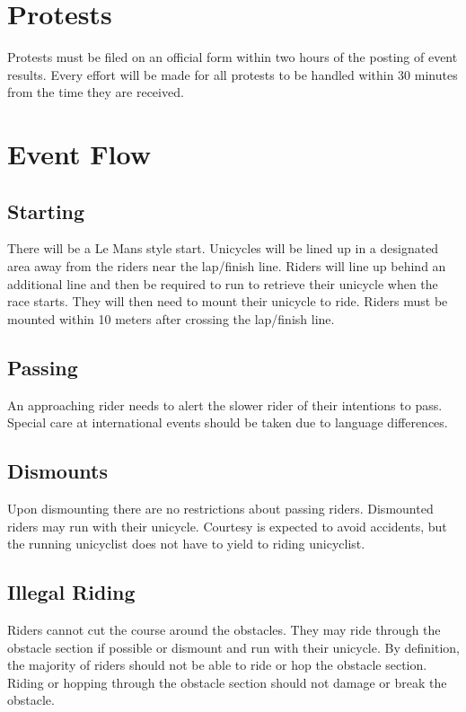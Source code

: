 \section{Protests}

Protests must be filed on an official form within two hours of the posting of event results.
Every effort will be made for all protests to be handled within 30 minutes from the time they are received.

\section{Event Flow}

\subsection{Starting}

There will be a Le Mans style start.
Unicycles will be lined up in a designated area away from the riders near the lap/finish line.
Riders will line up behind an additional line and then be required to run to retrieve their unicycle when the race starts.
They will then need to mount their unicycle to ride.
Riders must be mounted within 10 meters after crossing the lap/finish line.

\subsection{Passing}

An approaching rider needs to alert the slower rider of their intentions to pass.
Special care at international events should be taken due to language differences.

\subsection{Dismounts}

Upon dismounting there are no restrictions about passing riders.
Dismounted riders may run with their unicycle.
Courtesy is expected to avoid accidents, but the running unicyclist does not have to yield to riding unicyclist.

\subsection{Illegal Riding}

Riders cannot cut the course around the obstacles.
They may ride through the obstacle section if possible or dismount and run with their unicycle.
By definition, the majority of riders should not be able to ride or hop the obstacle section.
Riding or hopping through the obstacle section should not damage or break the obstacle.

